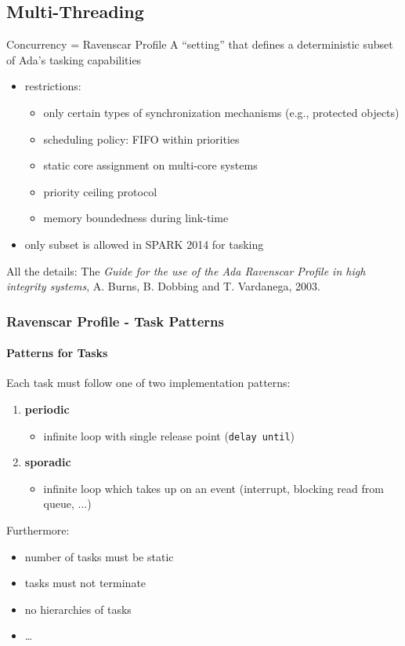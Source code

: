 \subsection{Multi-Threading}

\begin{frame}{Concurrency = Ravenscar Profile}
A ``setting'' that defines a deterministic subset of Ada's tasking capabilities
  \begin{itemize}
  \item restrictions:
    \begin{itemize}
    \item only certain types of synchronization mechanisms (e.g., protected objects)
    \item scheduling policy: FIFO within priorities
    \item static core assignment on multi-core systems
    \item priority ceiling protocol
    \item memory boundedness during link-time
    \end{itemize}
  \item only subset is allowed in SPARK 2014 for tasking
  \end{itemize}
All the details: The \emph{Guide for the use of the Ada Ravenscar Profile in high integrity systems}, A. Burns, B. Dobbing and T. Vardanega, 2003.
\end{frame}

\begin{frame}
  \frametitle{Ravenscar Profile - Task Patterns}
  \framesubtitle{Patterns for Tasks}
Each task must follow one of two implementation patterns:
\begin{enumerate}
\item \textbf{periodic}
  \begin{itemize}
  \item infinite loop with single release point (\texttt{delay until})
  \end{itemize}
\item \textbf{sporadic}
  \begin{itemize}
  \item infinite loop which takes up on an event (interrupt, blocking
    read from queue, ...)
  \end{itemize}
\end{enumerate}
Furthermore:
\begin{itemize}
\item number of tasks must be static
\item tasks must not terminate
\item no hierarchies of tasks
\item \dots
\end{itemize}
\end{frame}

